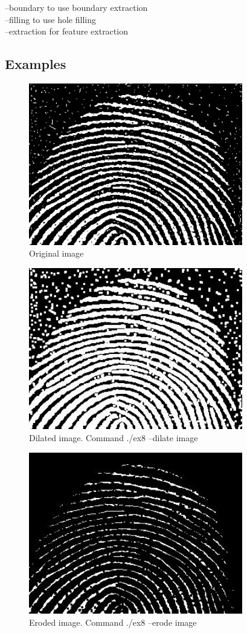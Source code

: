 \documentclass[10pt]{article}
\begin{document}
--boundary to use boundary extraction\\
--filling to use hole filling\\
--extraction for feature extraction

\subsection{Examples}
\begin{figure}[!ht]
	\centering
	\includegraphics[height=200pt]{./ex8/noisy_fingerprint.jpg}
	\caption{Original image}
\end{figure}
\begin{figure}[!ht]
	\centering
	\includegraphics[height=200pt]{./ex8/noisy_dilated.jpg}
	\caption{Dilated image. Command ./ex8 --dilate image}
\end{figure}
\begin{figure}[!ht]
	\centering
	\includegraphics[height=200pt]{./ex8/noisy_eroded.jpg}
	\caption{Eroded image. Command ./ex8 --erode image}
\end{figure}
\end{document}
